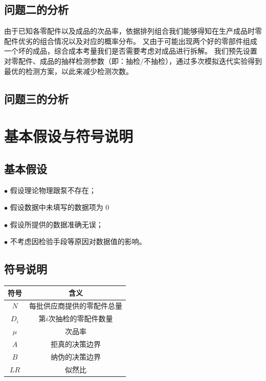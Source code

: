 \documentclass[withoutpreface,bwprint]{cumcmthesis} %
\begin{document}
\subsection{问题二的分析}
由于已知各零配件以及成品的次品率，依据排列组合我们能够得知在生产成品时零配件优劣的组合情况以及对应的概率分布。
又由于可能出现两个好的零部件组成一个坏的成品，综合成本考量我们是否需要考虑对成品进行拆解。
我们预先设置对零配件、成品的抽样检测参数（即：抽检/不抽检），通过多次模拟迭代实验得到最优的检测方案，以此来减少检测次数。
\subsection{问题三的分析}

\section{基本假设与符号说明}
\subsection{基本假设}
$\bullet$ 假设理论物理跟泵不存在；

$\bullet$ 假设数据中未填写的数据项为 0

$\bullet$ 假设所提供的数据准确无误；

$\bullet$ 不考虑因检验手段等原因对数据值的影响。

\subsection{符号说明}
\begin{table}[H]
	\centering
	\setlength{\tabcolsep}{20mm}%
	\begin{tabular}{cc}
		\toprule[1.5pt]
		\textbf{符号} & \textbf{含义}   \\  %
		\midrule[1pt]
		$N$         & 每批供应商提供的零配件总量 \\
		$D_{i}$     & 第$i$次抽检的零配件数量 \\
		$\mu$       & 次品率           \\
		$A$         & 拒真的决策边界       \\
		$B$         & 纳伪的决策边界       \\
		$LR$        & 似然比           \\
		\bottomrule[1.5pt]
	\end{tabular}
\end{table}
\end{document}
